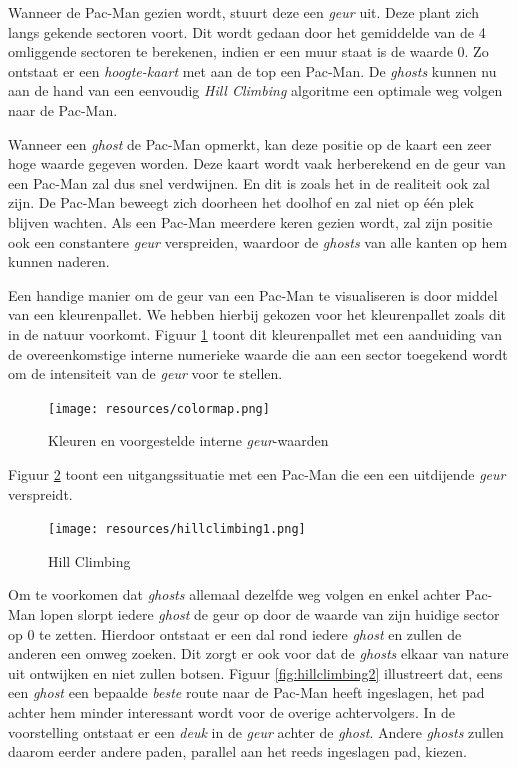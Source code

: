 \documentclass[12pt,a4paper]{report}
\begin{document}
Wanneer de Pac-Man gezien wordt, stuurt deze een \emph{geur} uit. Deze plant zich langs gekende sectoren voort. Dit wordt gedaan door het gemiddelde van de 4 omliggende sectoren te berekenen, indien er een muur staat is de waarde 0. Zo ontstaat er een \emph{hoogte-kaart} met aan de top een Pac-Man. De \emph{ghosts} kunnen nu aan de hand van een eenvoudig \emph{Hill Climbing} algoritme een optimale weg volgen naar de Pac-Man.

Wanneer een \emph{ghost} de Pac-Man opmerkt, kan deze positie op de kaart een zeer hoge waarde gegeven worden. Deze kaart wordt vaak herberekend en de geur van een Pac-Man zal dus snel verdwijnen. En dit is zoals het in de realiteit ook zal zijn. De Pac-Man beweegt zich doorheen het doolhof en zal niet op \'e\'en plek blijven wachten. Als een Pac-Man meerdere keren gezien wordt, zal zijn positie ook een constantere \emph{geur} verspreiden, waardoor de \emph{ghosts} van alle kanten op hem kunnen naderen. 

Een handige manier om de geur van een Pac-Man te visualiseren is door middel van een kleurenpallet. We hebben hierbij gekozen voor het kleurenpallet zoals dit in de natuur voorkomt. Figuur \ref{fig:colormap} toont dit kleurenpallet met een aanduiding van de overeenkomstige interne numerieke waarde die aan een sector toegekend wordt om de intensiteit van de \emph{geur} voor te stellen.

\begin{figure}[htbp]
  \centering
  \texttt{[image: resources/colormap.png]}
  \caption{Kleuren en voorgestelde interne \emph{geur}-waarden}
  \label{fig:colormap}
\end{figure}

Figuur \ref{fig:hillclimbing1} toont een uitgangssituatie met een Pac-Man die een een uitdijende \emph{geur} verspreidt.

\begin{figure}[htbp]
  \centering
  \texttt{[image: resources/hillclimbing1.png]}
  \caption{Hill Climbing}
  \label{fig:hillclimbing1}
\end{figure}

Om te voorkomen dat \emph{ghosts} allemaal dezelfde weg volgen en enkel achter Pac-Man lopen slorpt iedere \emph{ghost} de geur op door de waarde van zijn huidige sector op 0 te zetten. Hierdoor ontstaat er een dal rond iedere \emph{ghost} en zullen de anderen een omweg zoeken. Dit zorgt er ook voor dat de \emph{ghosts} elkaar van nature uit ontwijken en niet zullen botsen. Figuur \ref{fig:hillclimbing2} illustreert dat, eens een \emph{ghost} een bepaalde \emph{beste} route naar de Pac-Man heeft ingeslagen, het pad achter hem minder interessant wordt voor de overige achtervolgers. In de voorstelling ontstaat er een \emph{deuk} in de \emph{geur} achter de \emph{ghost}. Andere \emph{ghosts} zullen daarom eerder andere paden, parallel aan het reeds ingeslagen pad, kiezen.
\end{document}
